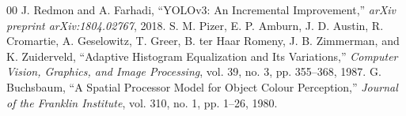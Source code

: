 \documentclass[conference]{IEEEtran}
\begin{document}
\begin{thebibliography}{00}
 J. Redmon and A. Farhadi, ``YOLOv3: An Incremental Improvement,'' \textit{arXiv preprint arXiv:1804.02767}, 2018.
 S. M. Pizer, E. P. Amburn, J. D. Austin, R. Cromartie, A. Geselowitz, T. Greer, B. ter Haar Romeny, J. B. Zimmerman, and K. Zuiderveld, ``Adaptive Histogram Equalization and Its Variations,'' \textit{Computer Vision, Graphics, and Image Processing}, vol. 39, no. 3, pp. 355--368, 1987.
 G. Buchsbaum, ``A Spatial Processor Model for Object Colour Perception,'' \textit{Journal of the Franklin Institute}, vol. 310, no. 1, pp. 1--26, 1980.
\end{thebibliography}
\end{document}
